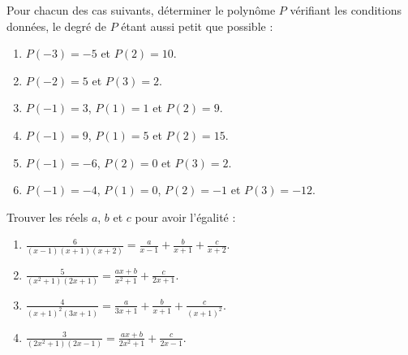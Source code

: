             \begin{exo}
                  Pour chacun des cas suivants, d\'eterminer le polyn\^ome $P$
                  v\'erifiant les conditions donn\'ees, le degr\'e de $P$ \'etant aussi petit que possible :
                  \begin{enumerate}
                        \item $P(-3) = -5$ et $P(2) = 10$.
                        \item $P(-2) =  5$ et $P(3) =  2$.
                        \item $P(-1) =  3$, $P(1) = 1$ et $P(2) =  9$.
                        \item $P(-1) =  9$, $P(1) = 5$ et $P(2) = 15$.
                        \item $P(-1) = -6$, $P(2) = 0$ et $P(3) =  2$.
                        \item $P(-1) = -4$, $P(1) = 0$, $P(2) =  -1$ et $P(3) = -12$.
                  \end{enumerate}
            \end{exo}
            \begin{exo}
                  Trouver les r\'eels $a$, $b$ et $c$ pour avoir l'\'egalit\'e :
                  \begin{enumerate}
                        \item $\displaystyle{
                                    \frac{6}{(x-1)(x+1)(x+2)}
                                    = 
                                    \frac{a}{x-1} + \frac{b}{x+1} + \frac{c}{x+2}
                              }$.
                        \item $\displaystyle{
                                    \frac{5}{(x^2+1)(2x+1)}
                                    = 
                                    \frac{a x + b}{x^2+1} + \frac{c}{2x+1}
                              }$.
                        \item $\displaystyle{
                                    \frac{4}{(x+1)^2(3x+1)}
                                    = 
                                    \frac{a}{3x+1} + \frac{b}{x+1} + \frac{c}{(x+1)^2}
                              }$.
                        \item $\displaystyle{
                                    \frac{3}{(2 x^2+1)(2x-1)}
                                    = 
                                    \frac{a x + b}{2x^2+1} + \frac{c}{2x-1}
                              }$.
                  \end{enumerate}
            \end{exo}

